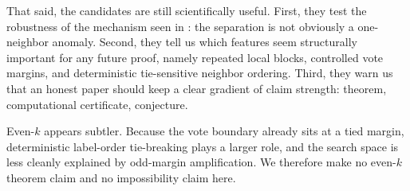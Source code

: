 That said, the candidates are still scientifically useful. First, they test the
robustness of the mechanism seen in : the
separation is not obviously a one-neighbor anomaly. Second, they tell us which
features seem structurally important for any future proof, namely repeated local
blocks, controlled vote margins, and deterministic tie-sensitive neighbor
ordering. Third, they warn us that an honest paper should keep a clear gradient
of claim strength: theorem, computational certificate, conjecture.

Even-$k$ appears subtler. Because the vote boundary already sits at a tied
margin, deterministic label-order tie-breaking plays a larger role, and the
search space is less cleanly explained by odd-margin amplification. We therefore
make no even-$k$ theorem claim and no impossibility claim here.
